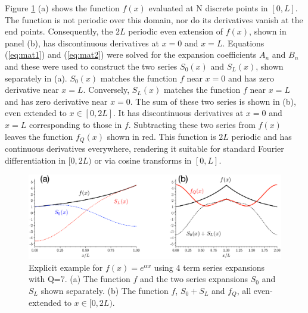 \documentclass{jfm-like}
\begin{document}
Figure \ref{fig:decomposition} (a) shows the function $f(x)$ evaluated at N discrete points in $[0,L]$. The function is not periodic over this domain, nor do its derivatives vanish
at the end points. Consequently, the $2L$ periodic even extension of $f(x)$, shown in panel (b), has discontinuous derivatives at $x=0$ and $x=L$. Equations (\ref{eq:mat1})
and (\ref{eq:mat2}) were solved for the expansion coefficients $A_n$ and $B_n$ and these were used to construct the two series $S_0(x)$ and $S_L(x)$, shown separately
in (a). $S_0(x)$ matches the function $f$ near $x=0$ and has zero derivative near $x=L$. Conversely,  $S_L(x)$ matches the function $f$ near $x=L$ and has zero derivative near $x=0$.
The sum of these two series is shown in (b), even extended to $x \in [0,2L]$. It has discontinuous derivatives at $x=0$ and $x=L$ corresponding to those in $f$. Subtracting these two series
from $f(x)$ leaves the function $f_Q(x)$ shown in red. This function is $2L$ periodic and has continuous derivatives everywhere, rendering it suitable for standard Fourier differentiation
in $[0,2L)$ or via cosine transforms in $[0,L]$.
 \begin{figure}
  \centerline{\includegraphics[width=1.0\textwidth]{FIGS/exp_figs/decomposition.eps}}
  \caption{Explicit example for $f(x)=e^{\alpha x}$ using 4 term series expansions with Q=7. (a) The function $f$ and the two series expansions  $S_0$ and $S_L$ shown separately.
  (b) The function $f$, $S_0 + S_L$ and $f_Q$, all even-extended to $x \in [0,2L)$.} 
  \label{fig:decomposition}
\end{figure}
\end{document}
